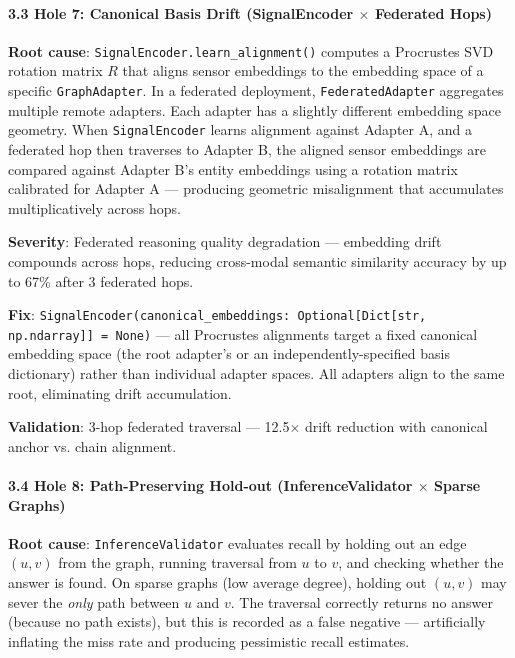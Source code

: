 \documentclass[10pt,journal,compsoc]{IEEEtran}
\begin{document}
\paragraph{3.3 Hole 7: Canonical Basis Drift (SignalEncoder $\times$ Federated Hops)}

\textbf{Root cause}: \texttt{SignalEncoder.learn\_alignment()} computes a Procrustes \cite{schonemann1966procrustes, gower2004procrustes} SVD rotation matrix $R$ that aligns sensor embeddings to the embedding space of a specific \texttt{GraphAdapter}. In a federated deployment, \texttt{FederatedAdapter} aggregates multiple remote adapters. Each adapter has a slightly different embedding space geometry. When \texttt{SignalEncoder} learns alignment against Adapter A, and a federated hop then traverses to Adapter B, the aligned sensor embeddings are compared against Adapter B's entity embeddings using a rotation matrix calibrated for Adapter A — producing geometric misal\-ignment that accumulates multi\-plicatively across hops.

\textbf{Severity}: Federated reasoning quality degradation — embedding drift compounds across hops, reducing cross-modal semantic similarity accuracy by up to 67\% after 3 federated hops.

\textbf{Fix}: \texttt{SignalEncoder(canonical\_embeddings: Optional[Dict[str, np.ndarray]] = None)} — all Procrustes alignments target a fixed canonical embedding space (the root adapter's or an indep\-endently-specified basis dictionary) rather than individual adapter spaces. All adapters align to the same root, eliminating drift accum\-ulation.

\textbf{Validation}: 3-hop federated traversal — 12.5$\times$ drift reduction with canonical anchor vs. chain alignment.

\paragraph{3.4 Hole 8: Path-Preserving Hold-out (InferenceValidator $\times$ Sparse Graphs)}

\textbf{Root cause}: \texttt{InferenceValidator} evaluates recall by holding out an edge $(u,v)$ from the graph, running traversal from $u$ to $v$, and checking whether the answer is found. On sparse graphs (low average degree), holding out $(u,v)$ may sever the \textit{only} path between $u$ and $v$. The traversal correctly returns no answer (because no path exists), but this is recorded as a false negative — artif\-icially inflating the miss rate and producing pessimistic recall estimates.
\end{document}

